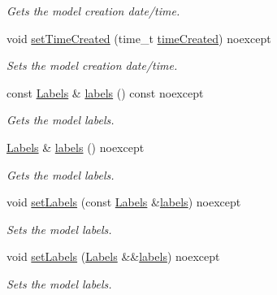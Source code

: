 \begin{DoxyCompactItemize}
\begin{DoxyCompactList}\small\item\em Gets the model creation date/time. \end{DoxyCompactList}\item 
void \hyperlink{group___classification_module_ga1a02e568a297cb23eac8ce73e5e5af41}{set\+Time\+Created} (time\+\_\+t \hyperlink{group___classification_module_ga8e19bae617a659a8999b50a72720228f}{time\+Created}) noexcept
\begin{DoxyCompactList}\small\item\em Sets the model creation date/time. \end{DoxyCompactList}\item 
const \hyperlink{group___classification_module_ga4c4d47162fed299b627f2e9d17381866}{Labels} \& \hyperlink{group___classification_module_ga123240dad792cb90b049e23cebabf178}{labels} () const noexcept
\begin{DoxyCompactList}\small\item\em Gets the model labels. \end{DoxyCompactList}\item 
\hyperlink{group___classification_module_ga4c4d47162fed299b627f2e9d17381866}{Labels} \& \hyperlink{group___classification_module_ga1f12a576a1db3447388f9a5660fa435a}{labels} () noexcept
\begin{DoxyCompactList}\small\item\em Gets the model labels. \end{DoxyCompactList}\item 
void \hyperlink{group___classification_module_gaa1e25ad45522aa213111143f91655bd6}{set\+Labels} (const \hyperlink{group___classification_module_ga4c4d47162fed299b627f2e9d17381866}{Labels} \&\hyperlink{group___classification_module_ga123240dad792cb90b049e23cebabf178}{labels}) noexcept
\begin{DoxyCompactList}\small\item\em Sets the model labels. \end{DoxyCompactList}\item 
void \hyperlink{group___classification_module_ga993c6e22ad71a3843fa4e737a29301a9}{set\+Labels} (\hyperlink{group___classification_module_ga4c4d47162fed299b627f2e9d17381866}{Labels} \&\&\hyperlink{group___classification_module_ga123240dad792cb90b049e23cebabf178}{labels}) noexcept
\begin{DoxyCompactList}\small\item\em Sets the model labels. \end{DoxyCompactList}\item 

\end{DoxyCompactItemize}
